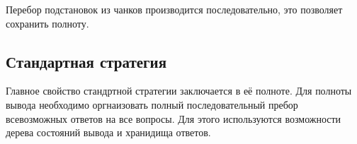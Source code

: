 Перебор подстановок из чанков производится последовательно, это позволяет сохранить полноту.

\subsection{Стандартная стратегия}
Главное свойство стандртной стратегии заключается в её полноте. Для полноты вывода необходимо оргнаизовать полный последовательный пребор всевозможных ответов на все вопросы. Для этого используются возможности дерева состояний вывода и хранидища ответов.



